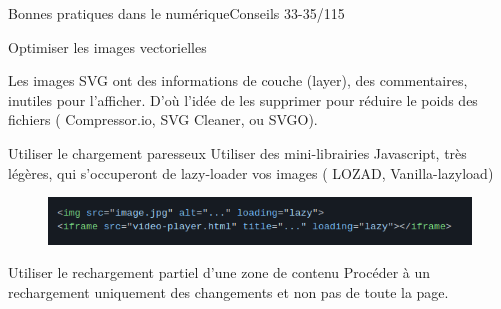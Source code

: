 

\begin{frame}{Bonnes pratiques dans le numérique}{Conseils 33-35/115}
\begin{block}{Optimiser les images vectorielles}

Les images SVG ont des informations de couche (layer), des commentaires, inutiles pour l’afficher. D’où l’idée de les supprimer pour réduire le poids des fichiers ( Compressor.io, SVG Cleaner, ou SVGO).
\end{block}

\begin{block}{Utiliser le chargement paresseux}
Utiliser des mini-librairies Javascript, très légères, qui s'occuperont de lazy-loader vos images ( LOZAD, Vanilla-lazyload)
\begin{figure}
    \centering
    \includegraphics[scale=0.5]{chapitre2/wdd4/fig/c1.png}
\end{figure}
\end{block}

\begin{block}{Utiliser le rechargement partiel d'une zone de contenu}
Procéder à un rechargement uniquement des changements et non pas de toute la page. 
\end{block}


\end{frame}


